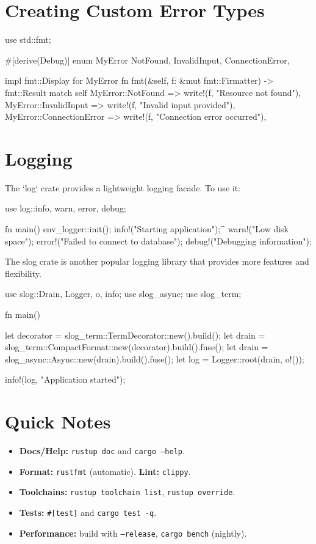 \documentclass[8pt,a4paper,twocolumn]{extarticle}
\begin{document}
\begin{Code}
\section{Creating Custom Error Types}

\begin{Code}
use std::fmt;

#[derive(Debug)]
enum MyError {
  NotFound,
  InvalidInput,
  ConnectionError,
}

impl fmt::Display for MyError {
  fn fmt(&self, f: &mut fmt::Firmatter) -> fmt::Result {
    match self {
      MyError::NotFound => write!(f, "Resource not found"),
      MyError::InvalidInput => write!(f, "Invalid input provided"),
      MyError::ConnectionError => write!(f, "Connection error occurred"),
    }
  }
}
\end{Code}


\section{Logging}

The `log` crate provides a lightweight logging facade. To use it:

\begin{Code}
use log::{info, warn, error, debug};

fn main() {
    env_logger::init();
    info!("Starting application");^
    warn!("Low disk space");
    error!("Failed to connect to database");
    debug!("Debugging information");
}
\end{Code}

The slog crate is another popular logging library that provides more features and flexibility.

\begin{Code}
use slog::{Drain, Logger, o, info};
use slog_async;
use slog_term;

fn main() {
    let decorator = slog_term::TermDecorator::new().build();
    let drain = slog_term::CompactFormat::new(decorator).build().fuse();
    let drain = slog_async::Async::new(drain).build().fuse();
    let log = Logger::root(drain, o!());

    info!(log, "Application started");
}
\end{Code}

\section{Quick Notes}
\begin{itemize}
  \item \textbf{Docs/Help:} \texttt{rustup doc} and \texttt{cargo --help}.
  \item \textbf{Format:} \texttt{rustfmt} (automatic). \textbf{Lint:} \texttt{clippy}.
  \item \textbf{Toolchains:} \texttt{rustup toolchain list}, \texttt{rustup override}.
  \item \textbf{Tests:} \texttt{\#[test]} and \texttt{cargo test -q}.
  \item \textbf{Performance:} build with \texttt{--release}, \texttt{cargo bench} (nightly).
\end{itemize}


\end{Code}
\end{document}
